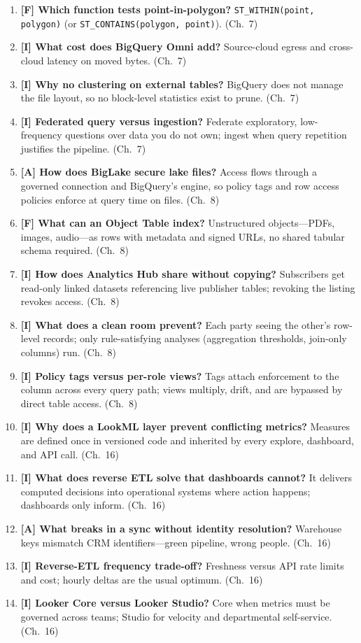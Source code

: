 \begin{enumerate}
    time---no clustering or managed statistics; native offers pruning, caching, predictable
    performance. (Ch.~7)
    \item \textbf{[F] Which function tests point-in-polygon?} \texttt{ST\_WITHIN(point, polygon)}
    (or \texttt{ST\_CONTAINS(polygon, point)}). (Ch.~7)
    \item \textbf{[I] What cost does BigQuery Omni add?} Source-cloud egress and cross-cloud
    latency on moved bytes. (Ch.~7)
    \item \textbf{[I] Why no clustering on external tables?} BigQuery does not manage the file
    layout, so no block-level statistics exist to prune. (Ch.~7)
    \item \textbf{[I] Federated query versus ingestion?} Federate exploratory, low-frequency
    questions over data you do not own; ingest when query repetition justifies the pipeline.
    (Ch.~7)
    \item \textbf{[A] How does BigLake secure lake files?} Access flows through a governed
    connection and BigQuery's engine, so policy tags and row access policies enforce at query time
    on files. (Ch.~8)
    \item \textbf{[F] What can an Object Table index?} Unstructured objects---PDFs, images,
    audio---as rows with metadata and signed URLs, no shared tabular schema required. (Ch.~8)
    \item \textbf{[I] How does Analytics Hub share without copying?} Subscribers get read-only
    linked datasets referencing live publisher tables; revoking the listing revokes access. (Ch.~8)
    \item \textbf{[I] What does a clean room prevent?} Each party seeing the other's row-level
    records; only rule-satisfying analyses (aggregation thresholds, join-only columns) run. (Ch.~8)
    \item \textbf{[I] Policy tags versus per-role views?} Tags attach enforcement to the column
    across every query path; views multiply, drift, and are bypassed by direct table access.
    (Ch.~8)
    \item \textbf{[I] Why does a LookML layer prevent conflicting metrics?} Measures are defined
    once in versioned code and inherited by every explore, dashboard, and API call. (Ch.~16)
    \item \textbf{[I] What does reverse ETL solve that dashboards cannot?} It delivers computed
    decisions into operational systems where action happens; dashboards only inform. (Ch.~16)
    \item \textbf{[A] What breaks in a sync without identity resolution?} Warehouse keys mismatch
    CRM identifiers---green pipeline, wrong people. (Ch.~16)
    \item \textbf{[I] Reverse-ETL frequency trade-off?} Freshness versus API rate limits and cost;
    hourly deltas are the usual optimum. (Ch.~16)
    \item \textbf{[I] Looker Core versus Looker Studio?} Core when metrics must be governed across
    teams; Studio for velocity and departmental self-service. (Ch.~16)
\end{enumerate}

